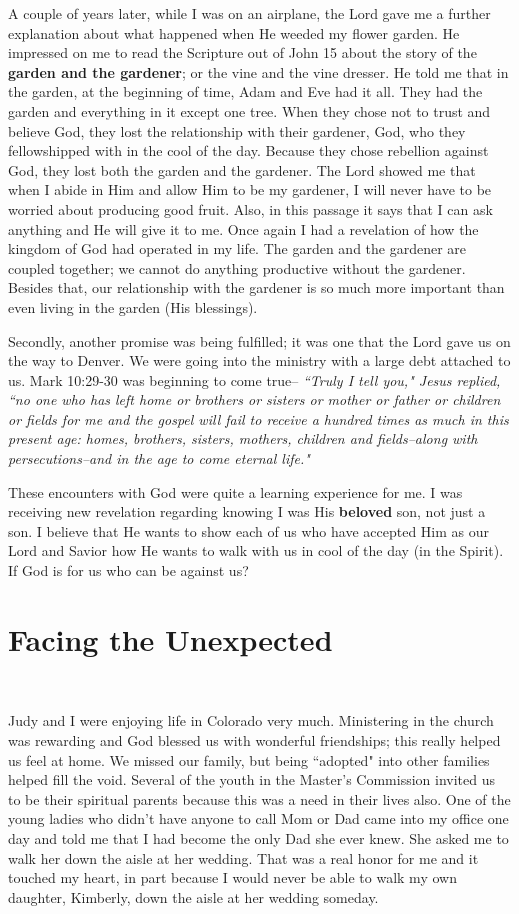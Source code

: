 \documentclass[oneside]{book}
\begin{document}
A couple of years later, while I was on an airplane, the Lord gave me a further explanation about what happened when He weeded my flower garden. He impressed on me to read the Scripture out of John 15 about the story of the \textbf{garden and the gardener}; or the vine and the vine dresser. He told me that in the garden, at the beginning of time, Adam and Eve had it all. They had the garden and everything in it except one tree. When they chose not to trust and believe God, they lost the relationship with their gardener, God, who they fellowshipped with in the cool of the day. Because they chose rebellion against God, they lost both the garden and the gardener. The Lord showed me that when I abide in Him and allow Him to be my gardener, I will never have to be worried about producing good fruit. Also, in this passage it says that I can ask anything and He will give it to me. Once again I had a revelation of how the kingdom of God had operated in my life. The garden and the gardener are coupled together; we cannot do anything productive without the gardener. Besides that, our relationship with the gardener is so much more important than even  living in the garden (His blessings).

Secondly, another promise was being fulfilled; it was one that the Lord gave us on the way to Denver. We were going into the ministry with a large debt attached to us. Mark 10:29-30 was beginning to come true-- \textit{``Truly I tell you," Jesus replied, ``no one who has left home or brothers or sisters or mother or father or children or fields for me and the gospel will fail to receive a hundred times as much in this present age: homes, brothers, sisters, mothers, children and fields--along with persecutions--and in the age to come eternal life."}

These encounters with God were quite a learning experience for me. I was receiving new revelation regarding knowing I was His \textbf{beloved} son, not just a son. I believe that He wants to show each of us who have accepted Him as our Lord and Savior how He wants to walk with us in cool of the day (in the Spirit). If God is for us who can be against us?


\chapter{Facing the Unexpected}
\

Judy and I were enjoying life in Colorado very much. Ministering in the church was rewarding and God blessed us with wonderful friendships; this really helped us feel at home. We missed our family, but being ``adopted" into other families helped fill the void. Several of the youth in the Master's Commission invited us to be their spiritual parents because this was a need in their lives also. One of the young ladies who didn't have anyone to call Mom or Dad came into my office one day and told me that I had become the only Dad she ever knew. She asked me to walk her down the aisle at her wedding. That was a real honor for me and it touched my heart, in part because I would never be able to walk my own daughter, Kimberly, down the aisle at her wedding someday.
\end{document}
